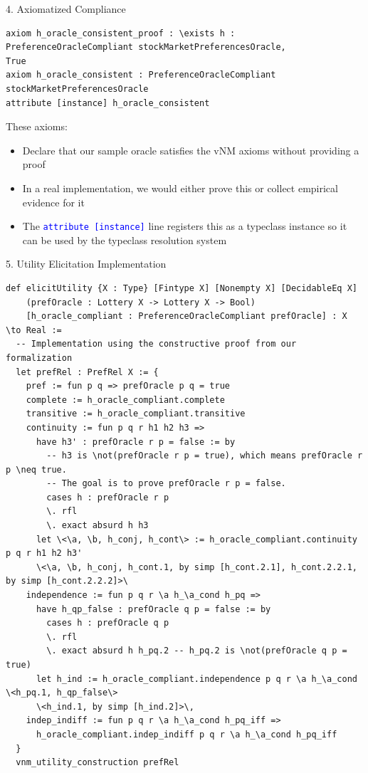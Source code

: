 \documentclass{article}
\theoremstyle{definition}
\newcommand{\tactic}[1]{\textcolor{blue}{\texttt{#1}}}
\begin{document}
4. Axiomatized Compliance
\begin{lstlisting}
axiom h_oracle_consistent_proof : \exists h : PreferenceOracleCompliant stockMarketPreferencesOracle,
True
axiom h_oracle_consistent : PreferenceOracleCompliant stockMarketPreferencesOracle
attribute [instance] h_oracle_consistent
\end{lstlisting}

These axioms:
\begin{itemize}
  \item Declare that our sample oracle satisfies the vNM axioms without providing a proof
  \item In a real implementation, we would either prove this or collect empirical evidence for it
  \item The \tactic{attribute [instance]} line registers this as a typeclass instance so it can be used by the typeclass resolution system
\end{itemize}

5. Utility Elicitation Implementation
\begin{lstlisting}
def elicitUtility {X : Type} [Fintype X] [Nonempty X] [DecidableEq X]
    (prefOracle : Lottery X -> Lottery X -> Bool)
    [h_oracle_compliant : PreferenceOracleCompliant prefOracle] : X \to Real :=
  -- Implementation using the constructive proof from our formalization
  let prefRel : PrefRel X := {
    pref := fun p q => prefOracle p q = true
    complete := h_oracle_compliant.complete
    transitive := h_oracle_compliant.transitive
    continuity := fun p q r h1 h2 h3 =>
      have h3' : prefOracle r p = false := by
        -- h3 is \not(prefOracle r p = true), which means prefOracle r p \neq true.
        -- The goal is to prove prefOracle r p = false.
        cases h : prefOracle r p
        \. rfl
        \. exact absurd h h3
      let \<\a, \b, h_conj, h_cont\> := h_oracle_compliant.continuity p q r h1 h2 h3'
      \<\a, \b, h_conj, h_cont.1, by simp [h_cont.2.1], h_cont.2.2.1, by simp [h_cont.2.2.2]>\
    independence := fun p q r \a h_\a_cond h_pq =>
      have h_qp_false : prefOracle q p = false := by
        cases h : prefOracle q p
        \. rfl
        \. exact absurd h h_pq.2 -- h_pq.2 is \not(prefOracle q p = true)
      let h_ind := h_oracle_compliant.independence p q r \a h_\a_cond \<h_pq.1, h_qp_false\>
      \<h_ind.1, by simp [h_ind.2]>\,
    indep_indiff := fun p q r \a h_\a_cond h_pq_iff =>
      h_oracle_compliant.indep_indiff p q r \a h_\a_cond h_pq_iff
  }
  vnm_utility_construction prefRel
\end{lstlisting}
\end{document}
